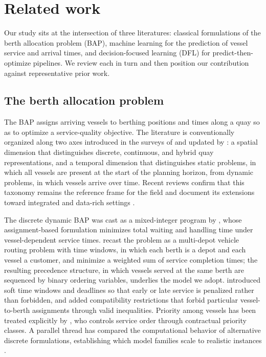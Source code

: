 \section{Related work}\label{sec:related}

Our study sits at the intersection of three literatures: classical formulations of the berth allocation problem (BAP), machine learning for the prediction of vessel service and arrival times, and decision-focused learning (DFL) for predict-then-optimize pipelines. We review each in turn and then position our contribution against representative prior work.

\subsection{The berth allocation problem}\label{sec:related-bap}

The BAP assigns arriving vessels to berthing positions and times along a quay so as to optimize a service-quality objective. The literature is conventionally organized along two axes introduced in the surveys of \citet{bierwirth2010survey} and updated by \citet{bierwirth2015followup}: a spatial dimension that distinguishes discrete, continuous, and hybrid quay representations, and a temporal dimension that distinguishes static problems, in which all vessels are present at the start of the planning horizon, from dynamic problems, in which vessels arrive over time. Recent reviews confirm that this taxonomy remains the reference frame for the field and document its extensions toward integrated and data-rich settings \citep{li2023stateoftheart, makhado2025systematic}.

The discrete dynamic BAP was cast as a mixed-integer program by \citet{imai2001dynamic}, whose assignment-based formulation minimizes total waiting and handling time under vessel-dependent service times. \citet{cordeau2005berth} recast the problem as a multi-depot vehicle routing problem with time windows, in which each berth is a depot and each vessel a customer, and minimize a weighted sum of service completion times; the resulting precedence structure, in which vessels served at the same berth are sequenced by binary ordering variables, underlies the model we adopt. \citet{golias2007berth} introduced soft time windows and deadlines so that early or late service is penalized rather than forbidden, and \citet{alzaabi2016berth} added compatibility restrictions that forbid particular vessel-to-berth assignments through valid inequalities. Priority among vessels has been treated explicitly by \citet{Ursavas2022PriorityControlBAP}, who controls service order through contractual priority classes. A parallel thread has compared the computational behavior of alternative discrete formulations, establishing which model families scale to realistic instances \citep{buhrkal2011models, guan2004berth, kim2003berth, lim1998berth}.

